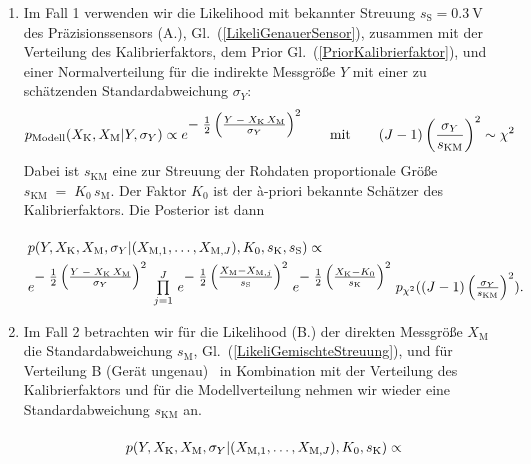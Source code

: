 \begin{enumerate}
	\item Im Fall 1 verwenden wir die Likelihood mit bekannter Streuung
	$s_\mathrm{S} = 0.3~\mathrm{V}$ des Präzisions\-sensors (A.), Gl.~(\ref{LikeliGenauerSensor}),
	zusammen mit der Verteilung des Kalibrierfaktors, dem Prior Gl.~(\ref{PriorKalibrierfaktor}),
	und einer Normalverteilung für die indirekte Messgröße $Y$ mit einer zu
	schätzenden Standardabweichung $\sigma_Y$:
\begin{equation}
p_\mathrm{Modell} (X_\mathrm{K}, X_\mathrm{M} | Y, \sigma_Y) \propto
e^{\textstyle -\;\frac{1}{2} \left(\frac{ Y \; - \; X_\mathrm{K} \, X_\mathrm{M}}{\sigma_Y} \right)^2}
\qquad \mathrm{mit} \qquad
(J-1) \left(\frac{\sigma_Y}{s_\mathrm{KM}}\right)^2 \sim \chi^2
\label{pdfModellNormalverteilt}
\end{equation}
	Dabei ist $s_\mathrm{KM}$ eine zur Streuung der Rohdaten proportionale Größe
	$s_\mathrm{KM} \; = \; K_0 \, s_\mathrm{M}$. Der Faktor $K_0$ ist der {\`a}-priori
	bekannte Schätzer des Kalibrierfaktors.
	Die Posterior ist dann
\begin{equation}
\arraycolsep=2.0pt\def\arraystretch{2.0}
\begin{array}{l}
p(Y, X_\mathrm{K}, X_\mathrm{M}, \sigma_Y | (X_{\mathrm{M},1}, \dots, X_{\mathrm{M},J}), K_0, s_\mathrm{K}, s_\mathrm{S}) \propto \\
e^{\T-\;\frac{1}{2} \left(\frac{ Y \; - \; X_\mathrm{K} \, X_\mathrm{M}}{\sigma_Y} \right)^2}
\; \prod\limits_{j=1}^J \,
e^{\T -\;\frac{1}{2} \left(\frac{ X_\mathrm{M} - X_{\mathrm{M},j} }{s_\mathrm{S}} \right)^2}
\;  e^{\T-\;\frac{1}{2} \left(\frac{X_\mathrm{K} - K_0}{s_\mathrm{K}} \right)^2}
\; p_{\chi^2} ((J-1) \left(\frac{\sigma_Y}{s_\mathrm{KM}}\right)^2) .
\end{array}
\label{PosteriorFall1}
\end{equation}
	\item Im Fall 2 betrachten wir für die Likelihood (B.) der direkten Messgröße $X_\mathrm{M}$
	die Standardabweichung $s_\mathrm{M}$, Gl.~(\ref{LikeliGemischteStreuung}), und für
	Verteilung B (\glqq Gerät ungenau\grqq) ~in Kombination mit der Verteilung des
	Kalibrierfaktors und für die
	Modellverteilung nehmen wir wieder eine Standardabweichung $s_\mathrm{KM}$
	an.
\begin{equation}
\arraycolsep=2.0pt\def\arraystretch{2.0}
\begin{array}{l}
p(Y, X_\mathrm{K}, X_\mathrm{M}, \sigma_Y | (X_{\mathrm{M},1}, \dots, X_{\mathrm{M},J}), K_0, s_\mathrm{K}) \propto \\

\end{array}
\end{equation}
\end{enumerate}
